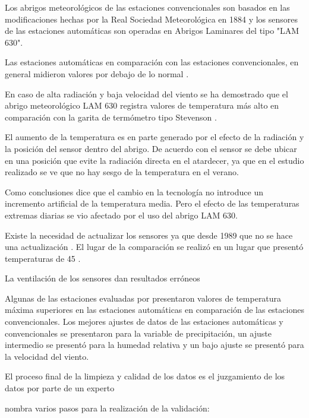 Los abrigos meteorológicos de las estaciones convencionales son basados en las modificaciones hechas por la Real Sociedad Meteorológica en 1884 y los sensores de las estaciones automáticas son operadas en Abrigos Laminares del tipo "LAM 630".

Las estaciones automáticas en comparación con las estaciones convencionales, en general midieron valores por debajo de lo normal \citet{kamtz1831lehrbuch}.

En caso de alta radiación y baja velocidad del viento se ha demostrado que el abrigo meteorológico LAM 630 registra valores de temperatura más alto en comparación con la garita de termómetro tipo Stevenson \citep{lacombe2010results, kaspar2016climate}.

El aumento de la temperatura es en parte generado por el efecto de la radiación y la posición del sensor dentro del abrigo. De acuerdo con \citet{kaspar2016climate} el sensor se debe ubicar en una posición que evite la radiación directa en el atardecer, ya que en el estudio realizado se ve que no hay sesgo de la temperatura en el verano.

Como conclusiones \citet{kaspar2016climate} dice que el cambio en la tecnología no introduce un incremento artificial de la temperatura media. Pero el efecto de las temperaturas extremas diarias se vio afectado por el uso del abrigo LAM 630.

Existe la necesidad de actualizar los sensores ya que desde 1989 que no se hace una actualización \citep{lacombe2010results}. El lugar de la comparación se realizó en un lugar que presentó temperaturas de 45 \celc. 

La ventilación de los sensores dan resultados erróneos \citep{lacombe2010results}

Algunas de las estaciones evaluadas por \citet{Soares2017} presentaron valores de temperatura máxima superiores en las estaciones automáticas en comparación de las estaciones convencionales. Los mejores ajustes de datos de las estaciones automáticas y convencionales se presentaron para la variable de precipitación, un ajuste intermedio se presentó para la humedad relativa y un bajo ajuste se presentó para la velocidad del viento.

El proceso final de la limpieza y calidad de los datos es el juzgamiento de los datos por parte de un experto \citep{Estevez2008}

\cite{Estevez2008} nombra varios pasos para la realización de la validación:

